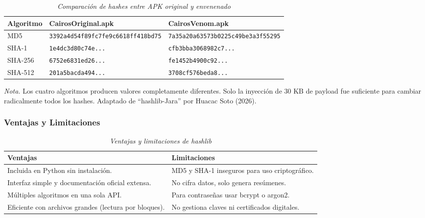 \documentclass[12pt,a4paper]{article}
\begin{document}
\begin{table}[H]
\centering
\begin{threeparttable}
\caption{\textit{Comparación de hashes entre APK original y envenenado}}
\label{tab:hashes_apk}
\begin{tabular}{p{2cm}p{5.5cm}p{5.5cm}}
\toprule
\textbf{Algoritmo} & \textbf{CairosOriginal.apk} & \textbf{CairosVenom.apk} \\
\midrule
MD5 & \texttt{3392a4d54f89fc7fe9c6618ff418bd75} & \texttt{7a35a20a63573b0225c49be3a3f55295} \\
SHA-1 & \texttt{1e4dc3d80c74e...} & \texttt{cfb3bba3068982c7...} \\
SHA-256 & \texttt{6752e6831ed26...} & \texttt{fe1452b4900c92...} \\
SHA-512 & \texttt{201a5bacda494...} & \texttt{3708cf576beda8...} \\
\bottomrule
\end{tabular}
\begin{tablenotes}
\item \textit{Nota.} Los cuatro algoritmos producen valores completamente diferentes. Solo la inyección de 30 KB de payload fue suficiente para cambiar radicalmente todos los hashes. Adaptado de \enquote{hashlib-Jara} por Huacac Soto (2026).
\end{tablenotes}
\end{threeparttable}
\end{table}

\subsubsection{Ventajas y Limitaciones}

\begin{table}[H]
\centering
\begin{threeparttable}
\caption{\textit{Ventajas y limitaciones de hashlib}}
\begin{tabular}{p{6.5cm}p{6.5cm}}
\toprule
\textbf{Ventajas} & \textbf{Limitaciones} \\
\midrule
Incluida en Python sin instalación. & MD5 y SHA-1 inseguros para uso criptográfico. \\
Interfaz simple y documentación oficial extensa. & No cifra datos, solo genera resúmenes. \\
Múltiples algoritmos en una sola API. & Para contraseñas usar bcrypt o argon2. \\
Eficiente con archivos grandes (lectura por bloques). & No gestiona claves ni certificados digitales. \\
\bottomrule
\end{tabular}
\end{threeparttable}
\end{table}
\end{document}
